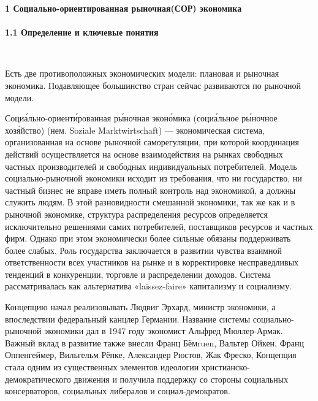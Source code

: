 \documentclass[14pt,a4paper]{article}
\begin{document}
    \newpage
    \begin{center}
        \textbf{1 Социально-ориентированная рыночная(СОР) экономика}
        \\
        \HRule\\[0.5cm]
        \textbf{1.1 Определение и ключевые понятия}
    \end{center}
    \\
    \par
    Есть две противоположных экономических модели: плановая и рыночная экономика. Подавляющее большинство стран сейчас развиваются по рыночной модели.
    \par
    Социа́льно-ориенти́рованная ры́ночная эконо́мика (социа́льное ры́ночное хозя́йство) (нем. Soziale Marktwirtschaft) — экономическая система, организованная на основе рыночной саморегуляции, при которой координация действий осуществляется на основе взаимодействия на рынках свободных частных производителей и свободных индивидуальных потребителей. Модель социально-рыночной экономики исходит из требования, что ни государство, ни частный бизнес не вправе иметь полный контроль над экономикой, а должны служить людям. В этой разновидности смешанной экономики, так же как и в рыночной экономике, структура распределения ресурсов определяется исключительно решениями самих потребителей, поставщиков ресурсов и частных фирм. Однако при этом экономически более сильные обязаны поддерживать более слабых. Роль государства заключается в развитии чувства взаимной ответственности всех участников на рынке и в корректировке несправедливых тенденций в конкуренции, торговле и распределении доходов. Система рассматривалась как альтернатива «laissez-faire» капитализму и социализму.
    \par
    Концепцию начал реализовывать Людвиг Эрхард, министр экономики, а впоследствии федеральный канцлер Германии. Название системы социально-рыночной экономики дал в 1947 году экономист Альфред Мюллер-Армак. Важный вклад в развитие также внесли Франц Бёмruen, Вальтер Ойкен, Франц Оппенгеймер, Вильгельм Рёпке, Александер Рюстов, Жак Фреско, Концепция стала одним из существенных элементов идеологии христианско-демократического движения и получила поддержку со стороны социальных консерваторов, социальных либералов и социал-демократов.
    \par
\end{document}
